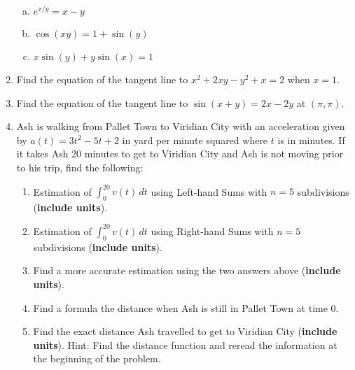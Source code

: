 \documentclass[10pt]{article}
\theoremstyle{Theorem}
\theoremstyle{definition}
\theoremstyle{remark}
\theoremstyle{custom}
\begin{document}
\begin{enumerate}[1.]
\begin{enumerate}[a.]
\item $e^{x/y}=x-y$
\item $\cos(xy)=1+\sin(y)$
\item $x\sin(y)+y\sin(x)=1$
\end{enumerate}
\item Find the equation of the tangent line to $x^2+2xy-y^2+x=2$ when $x=1$.
\item Find the equation of the tangent line to $\sin(x+y)=2x-2y$ at $(\pi,\pi)$.
\item Ash is walking from Pallet Town to Viridian City with an acceleration given by $a(t)=3t^2-5t+2$ in yard per minute squared where $t$ is in minutes. If it takes Ash 20 minutes to get to Viridian City and Ash is not moving prior to his trip, find the following:
	\begin{enumerate}
	\item Estimation of $\displaystyle \int_0^{20} v(t) \, dt$ using Left-hand Sums with $n=5$ subdivisions (\textbf{include units}).

	\item Estimation of $\displaystyle \int_0^{20} v(t) \, dt$ using Right-hand Sums with $n=5$ subdivisions (\textbf{include units}).

	\item Find a more accurate estimation using the two answers above (\textbf{include units}). 

	\item Find a formula the distance when Ash is still in Pallet Town at time 0.

	\item Find the exact distance Ash travelled to get to Viridian City (\textbf{include units}). Hint: Find the distance function and reread the information at the beginning of the problem.

	\end{enumerate}
\end{enumerate}
\end{document}

